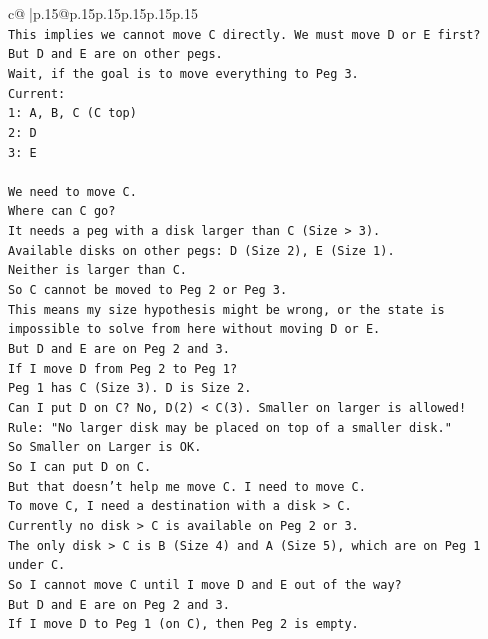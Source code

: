\documentclass{article}
\begin{document}
{\begin{supertabular}{c@{$\;$}|p{.15\linewidth}@{}p{.15\linewidth}p{.15\linewidth}p{.15\linewidth}p{.15\linewidth}p{.15\linewidth}}
{{{\\ 
\texttt{This implies we cannot move C directly. We must move D or E first?} \\
\texttt{But D and E are on other pegs.} \\
\texttt{Wait, if the goal is to move everything to Peg 3.} \\
\texttt{Current:} \\
\texttt{1: A, B, C (C top)} \\
\texttt{2: D} \\
\texttt{3: E} \\
\\ 
\texttt{We need to move C.} \\
\texttt{Where can C go?} \\
\texttt{It needs a peg with a disk larger than C (Size > 3).} \\
\texttt{Available disks on other pegs: D (Size 2), E (Size 1).} \\
\texttt{Neither is larger than C.} \\
\texttt{So C cannot be moved to Peg 2 or Peg 3.} \\
\texttt{This means my size hypothesis might be wrong, or the state is impossible to solve from here without moving D or E.} \\
\texttt{But D and E are on Peg 2 and 3.} \\
\texttt{If I move D from Peg 2 to Peg 1?} \\
\texttt{Peg 1 has C (Size 3). D is Size 2.} \\
\texttt{Can I put D on C? No, D(2) < C(3). Smaller on larger is allowed!} \\
\texttt{Rule: "No larger disk may be placed on top of a smaller disk."} \\
\texttt{So Smaller on Larger is OK.} \\
\texttt{So I can put D on C.} \\
\texttt{But that doesn't help me move C. I need to move C.} \\
\texttt{To move C, I need a destination with a disk > C.} \\
\texttt{Currently no disk > C is available on Peg 2 or 3.} \\
\texttt{The only disk > C is B (Size 4) and A (Size 5), which are on Peg 1 under C.} \\
\texttt{So I cannot move C until I move D and E out of the way?} \\
\texttt{But D and E are on Peg 2 and 3.} \\
\texttt{If I move D to Peg 1 (on C), then Peg 2 is empty.} \\
}}}
\end{supertabular}}
\end{document}

